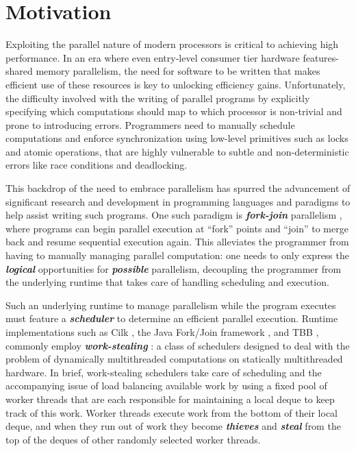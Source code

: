 \documentclass[bsc,frontabs,singlespacing,parskip,deptreport,normalheadings]{infthesis}
\begin{document}
\section{Motivation}

Exploiting the parallel nature of modern processors is critical to achieving
high performance. In an era where even entry-level consumer tier hardware
features-shared memory parallelism, the need for software to be written that
makes efficient use of these resources is key to unlocking efficiency gains.
Unfortunately, the difficulty involved with the writing of parallel programs by
explicitly specifying which computations should map to which processor is
non-trivial and prone to introducing errors. Programmers need to manually
schedule computations and enforce synchronization using low-level primitives
such as locks and atomic operations, that are highly vulnerable to subtle and
non-deterministic errors like race conditions and deadlocking.

This backdrop of the need to embrace parallelism has spurred the advancement of
significant research and development in programming languages and paradigms to
help assist writing such programs. One such paradigm is
\textit{\textbf{fork-join}} parallelism \cite{conway_multiprocessor_1963,
nyman_notes_2016}, where programs can begin parallel execution at ``fork''
points and ``join'' to merge back and resume sequential execution again. This
alleviates the programmer from having to manually managing parallel computation:
one needs to only express the \textbf{\textit{logical}} opportunities for
\textit{\textbf{possible}} parallelism, decoupling the programmer from the
underlying runtime that takes care of handling scheduling and execution.

Such an underlying runtime to manage parallelism while the program executes must
feature a \textit{\textbf{scheduler}} to determine an efficient parallel
execution. Runtime implementations such as Cilk
\cite{frigo_implementation_1998}, the Java Fork/Join framework
\cite{lea_java_2000}, and TBB \cite{noauthor_advanced_nodate}, commonly employ
\textbf{\textit{work-stealing}} \cite{blumofe_cilk_1995}: a class of schedulers designed to deal with the
problem of dynamically multithreaded computations on statically multithreaded
hardware. In brief, work-stealing schedulers take care
of scheduling and the accompanying issue of load balancing available work by
using a fixed pool of worker threads that are each responsible for maintaining a
local deque to keep track of this work. Worker threads execute work from the
bottom of their local deque, and when they run out of work they become
\textit{\textbf{thieves}} and \textit{\textbf{steal}} from the top of the deques
of other randomly selected worker threads.
\end{document}
